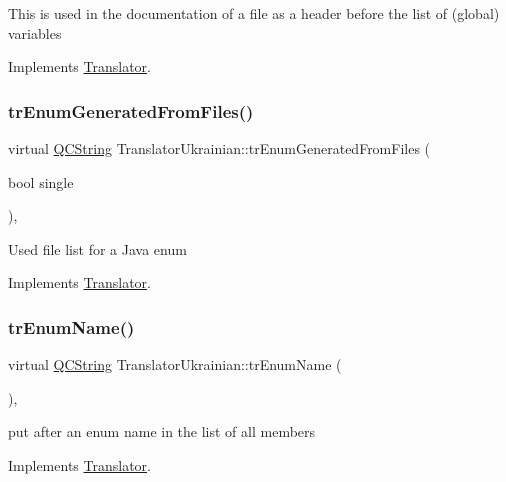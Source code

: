 This is used in the documentation of a file as a header before the list of (global) variables 

Implements \mbox{\hyperlink{class_translator}{Translator}}.

\mbox{\label{class_translator_ukrainian_a58493a08dfdbdaa5ad41d185401efd59}} 
\subsubsection{\texorpdfstring{trEnumGeneratedFromFiles()}{trEnumGeneratedFromFiles()}}
{\footnotesize\ttfamily virtual \mbox{\hyperlink{class_q_c_string}{Q\+C\+String}} Translator\+Ukrainian\+::tr\+Enum\+Generated\+From\+Files (\begin{DoxyParamCaption}\item[{bool}]{single }\end{DoxyParamCaption})\hspace{0.3cm}{\ttfamily [inline]}, {\ttfamily [virtual]}}

Used file list for a Java enum 

Implements \mbox{\hyperlink{class_translator}{Translator}}.

\mbox{\label{class_translator_ukrainian_af8b8860a5ebc528d962d86318da453cb}} 
\subsubsection{\texorpdfstring{trEnumName()}{trEnumName()}}
{\footnotesize\ttfamily virtual \mbox{\hyperlink{class_q_c_string}{Q\+C\+String}} Translator\+Ukrainian\+::tr\+Enum\+Name (\begin{DoxyParamCaption}{ }\end{DoxyParamCaption})\hspace{0.3cm}{\ttfamily [inline]}, {\ttfamily [virtual]}}

put after an enum name in the list of all members 

Implements \mbox{\hyperlink{class_translator}{Translator}}.

\mbox{\label{class_translator_ukrainian_a4cfb282f21f2875417c10a5ff452be67}} 
